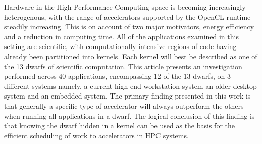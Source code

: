 \documentclass[../document.tex]{subfiles}
\begin{document}
Hardware in the High Performance Computing space is becoming increasingly
heterogenous, with the range of accelerators supported by the OpenCL runtime
steadily increasing. This is on account of two major motivators, energy
efficiency and a reduction in computing time. All of the applications examined
in this setting are scientific, with computationally intensive regions of code
having already been partitioned into kernels. Each kernel will best be
described as one of the 13 dwarfs of scientific computation. 
This article presents an investigation  performed across 40 applications,
encompassing 12 of the 13 dwarfs, on 3 different systems namely, a current
high-end workstation system an older desktop system and an embedded system.
The primary finding presented in this work is that  generally a specific type
of accelerator will always outperform the others when running all applications
in a dwarf. The logical conclusion of this finding is that knowing the dwarf
hidden in a kernel can be used as the basis for the efficient scheduling of
work to accelerators in HPC systems.

\end{document}
